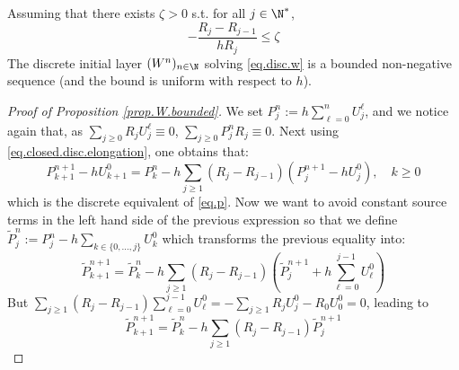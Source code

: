 \documentclass[]{jnsao}
\renewcommand{\tr}{R}
\newcommand{\tP}{\tilde{P}}
\begin{document}
\begin{proposition}\label{prop.W.bounded}
	Assuming that there exists $\zeta>0$ s.t. for all $j \in \N^*$,  
	$$
	- \frac{R_j-R_{j-1}}{h R_j}  \leq \zeta 
	$$
	The discrete initial layer $(W^n)_{n\in\N}$ solving \eqref{eq.disc.w} is a bounded non-negative sequence (and the bound is uniform with respect to $h$).
\end{proposition} 
 
\begin{proof}[Proof of Proposition \ref{prop.W.bounded}]
 	We set $P^n_j:= h \sum_{\ell=0}^n U^\ell_j$, and we notice again that, as $\sum_{j\geq 0}\tr_j U^{\ell}_j \equiv 0$, 
	$\sum_{j\geq 0} P^n_j \tr_j \equiv 0$. Next using \eqref{eq.closed.disc.elongation}, one obtains that:
 	$$
 	P^{n+1}_{k+1} - h U^0_{k+1} = P^n_k - h\sum_{j\geq 1} (\tr_j-\tr_{j-1})  (P^{n+1}_j-h U^0_j), \quad k\geq 0 
 	$$
 	which is the discrete equivalent of \eqref{eq.p}. 
	Now we want to avoid constant source terms in the left hand side of 
	the previous expression so that we define $\tP_j^n := P^n_j - h \sum_{k\in\{0,\dots,j\}} U^0_k$  
	which transforms the previous equality into:
 	$$
 	\tP_{k+1}^{n+1} = \tP_{k}^n - h \sum_{j\geq 1} (\tr_j-\tr_{j-1}) 
	 \left(\tP^{n+1}_j+ h \sum_{\ell = 0}^{j-1}U^0_\ell\right)
 	$$
 	But $\sum_{j\geq 1}( \tr_j-\tr_{j-1}) \sum_{\ell=0}^{j-1} U^0_{\ell} 
	= - \sum_{j\geq 1} \tr_j U^0_j - \tr_0 U^0_0 = 0$, leading to 
 	$$
 	\tP_{k+1}^{n+1} = \tP_{k}^n - h \sum_{j\geq 1} (\tr_j-\tr_{j-1})  \tP^{n+1}_j %
 	$$


\end{proof}
\end{document}
